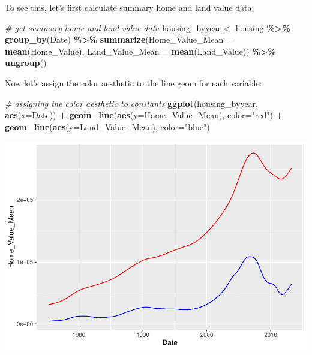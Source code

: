 \documentclass[
]{book}
\newenvironment{Shaded}{\begin{snugshade}}{\end{snugshade}}
\newcommand{\CommentTok}[1]{\textcolor[rgb]{0.56,0.35,0.01}{\textit{#1}}}
\newcommand{\DataTypeTok}[1]{\textcolor[rgb]{0.13,0.29,0.53}{#1}}
\newcommand{\KeywordTok}[1]{\textcolor[rgb]{0.13,0.29,0.53}{\textbf{#1}}}
\newcommand{\NormalTok}[1]{#1}
\newcommand{\OperatorTok}[1]{\textcolor[rgb]{0.81,0.36,0.00}{\textbf{#1}}}
\newcommand{\StringTok}[1]{\textcolor[rgb]{0.31,0.60,0.02}{#1}}
\begin{document}
To see this, let's first calculate summary home and land value data:

\begin{Shaded}
\begin{Highlighting}[]
\CommentTok{\# get summary home and land value data}
\NormalTok{housing\_byyear \textless{}{-}}\StringTok{ }
\StringTok{  }\NormalTok{housing }\OperatorTok{\%\textgreater{}\%}
\StringTok{  }\KeywordTok{group\_by}\NormalTok{(Date) }\OperatorTok{\%\textgreater{}\%}
\StringTok{  }\KeywordTok{summarize}\NormalTok{(}\DataTypeTok{Home\_Value\_Mean =} \KeywordTok{mean}\NormalTok{(Home\_Value),}
            \DataTypeTok{Land\_Value\_Mean =} \KeywordTok{mean}\NormalTok{(Land\_Value)) }\OperatorTok{\%\textgreater{}\%}
\StringTok{  }\KeywordTok{ungroup}\NormalTok{()}
\end{Highlighting}
\end{Shaded}

Now let's assign the color aesthetic to the line geom for each variable:

\begin{Shaded}
\begin{Highlighting}[]
\CommentTok{\# assigning the color aesthetic to constants}
\KeywordTok{ggplot}\NormalTok{(housing\_byyear, }\KeywordTok{aes}\NormalTok{(}\DataTypeTok{x=}\NormalTok{Date)) }\OperatorTok{+}
\StringTok{  }\KeywordTok{geom\_line}\NormalTok{(}\KeywordTok{aes}\NormalTok{(}\DataTypeTok{y=}\NormalTok{Home\_Value\_Mean), }\DataTypeTok{color=}\StringTok{"red"}\NormalTok{) }\OperatorTok{+}
\StringTok{  }\KeywordTok{geom\_line}\NormalTok{(}\KeywordTok{aes}\NormalTok{(}\DataTypeTok{y=}\NormalTok{Land\_Value\_Mean), }\DataTypeTok{color=}\StringTok{"blue"}\NormalTok{)}
\end{Highlighting}
\end{Shaded}

\includegraphics{R/Rgraphics/figures/unnamed-chunk-217-1.pdf}
\end{document}
